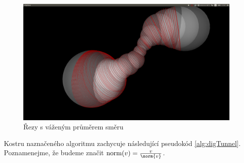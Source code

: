 \begin{figure}[ht]
    \centering
    \includegraphics[width=\textwidth]{img/weighted_dir.png}
    \caption{Řezy s váženým průměrem směru}
  \centering
  \label{fig:weighted_dir}
\end{figure}


Kostru naznačeného algoritmu zachycuje následující pseudokód \ref{alg:digTunnel}.
Poznamenejme, že budeme značit $ \operatorname{norm}(v) = \frac{v}{\norm{v}}$.


